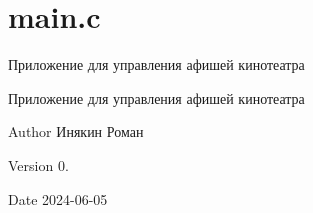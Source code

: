 \chapter{main.\+c}
\hypertarget{index}{}\label{index}
Приложение для управления афишей кинотеатра

Приложение для управления афишей кинотеатра   

\begin{DoxyAuthor}{Author}
Инякин Роман 
\end{DoxyAuthor}
\begin{DoxyVersion}{Version}
0. 
\end{DoxyVersion}
\begin{DoxyDate}{Date}
2024-\/06-\/05 
\end{DoxyDate}
